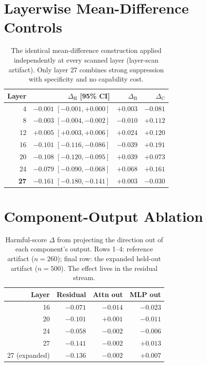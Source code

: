 \documentclass[11pt]{article}
\newcommand{\dH}{\ensuremath{\Delta_{\mathrm{H}}}}
\newcommand{\dB}{\ensuremath{\Delta_{\mathrm{B}}}}
\newcommand{\dC}{\ensuremath{\Delta_{\mathrm{C}}}}
\begin{document}
\section{Layerwise Mean-Difference Controls}
\label{app:layerwise}

\begin{table}[h]
\centering
\footnotesize
\setlength{\tabcolsep}{4.5pt}
\begin{tabular}{@{}rrrr@{}}
\toprule
Layer & \dH{} [95\% CI] & \dB{} & \dC{} \\
\midrule
4  & $-0.001$ $[-0.001,+0.000]$ & $+0.003$ & $-0.081$ \\
8  & $-0.003$ $[-0.004,-0.002]$ & $-0.010$ & $+0.112$ \\
12 & $+0.005$ $[+0.003,+0.006]$ & $+0.024$ & $+0.120$ \\
16 & $-0.101$ $[-0.116,-0.086]$ & $-0.039$ & $+0.191$ \\
20 & $-0.108$ $[-0.120,-0.095]$ & $+0.039$ & $+0.073$ \\
24 & $-0.079$ $[-0.090,-0.068]$ & $+0.068$ & $+0.161$ \\
\textbf{27} & $\mathbf{-0.161}$ $[-0.180,-0.141]$ & $\mathbf{+0.003}$ & $\mathbf{-0.030}$ \\
\bottomrule
\end{tabular}
\caption{The identical mean-difference construction applied independently at
every scanned layer (layer-scan artifact).  Only layer 27 combines strong
suppression with specificity and no capability cost.}
\label{tab:layerwise}
\end{table}

\section{Component-Output Ablation}
\label{app:component}

\begin{table}[h]
\centering
\footnotesize
\setlength{\tabcolsep}{4pt}
\begin{tabular}{@{}rrrr@{}}
\toprule
Layer & Residual & Attn out & MLP out \\
\midrule
16 & $-0.071$ & $-0.014$ & $-0.023$ \\
20 & $-0.101$ & $+0.001$ & $-0.011$ \\
24 & $-0.058$ & $-0.002$ & $-0.006$ \\
27 & $-0.141$ & $-0.002$ & $+0.013$ \\
\midrule
27 (expanded) & $-0.136$ & $-0.002$ & $+0.007$ \\
\bottomrule
\end{tabular}
\caption{Harmful-score $\Delta$ from projecting the direction out of each
component's output.  Rows 1--4: reference artifact ($n=260$); final row: the
expanded held-out artifact ($n=500$).  The effect lives in the residual stream.}
\label{tab:component}
\end{table}
\end{document}
